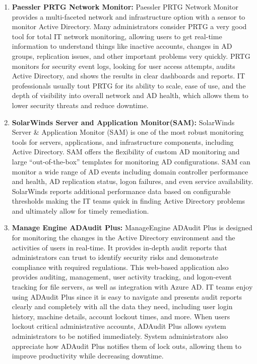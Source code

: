 \begin{enumerate}
    \item \textbf{Paessler PRTG Network Monitor:} Paessler PRTG Network Monitor provides a multi-faceted network and infrastructure option with a sensor to monitor Active Directory. Many administrators consider PRTG a very good tool for total IT network monitoring, allowing users to get real-time information to understand things like inactive accounts, changes in AD groups, replication issues, and other important problems very quickly. PRTG monitors for security event logs, looking for user access attempts, audits Active Directory, and shows the results in clear dashboards and reports. IT professionals usually tout PRTG for its ability to scale, ease of use, and the depth of visibility into overall network and AD health, which allows them to lower security threats and reduce downtime.
    \item \textbf{SolarWinds Server and Application Monitor(SAM):} SolarWinds Server \& Application Monitor (SAM) is one of the most robust monitoring tools for servers, applications, and infrastructure components, including Active Directory. SAM offers the flexibility of custom AD monitoring and large “out-of-the-box” templates for monitoring AD configurations. SAM can monitor a wide range of AD events including domain controller performance and health, AD replication status, logon failures, and even service availability. SolarWinds reports additional performance data based on configurable thresholds making the IT teams quick in finding Active Directory problems and ultimately allow for timely remediation.
    \item \textbf{Manage Engine ADAudit Plus:} ManageEngine ADAudit Plus is designed for monitoring the changes in the Active Directory environment and the activities of users in real-time. It provides in-depth audit reports that administrators can trust to identify security risks and demonstrate compliance with required regulations. This web-based application also provides auditing, management, user activity tracking, and logon-event tracking for file servers, as well as integration with Azure AD. IT teams enjoy using ADAudit Plus since it is easy to navigate and presents audit reports clearly and completely with all the data they need, including user login history, machine details, account lockout times, and more. When users lockout critical administrative accounts, ADAudit Plus allows system administrators to be notified immediately. System administrators also appreciate how ADAudit Plus notifies them of lock outs, allowing them to improve productivity while decreasing downtime.

\end{enumerate}
